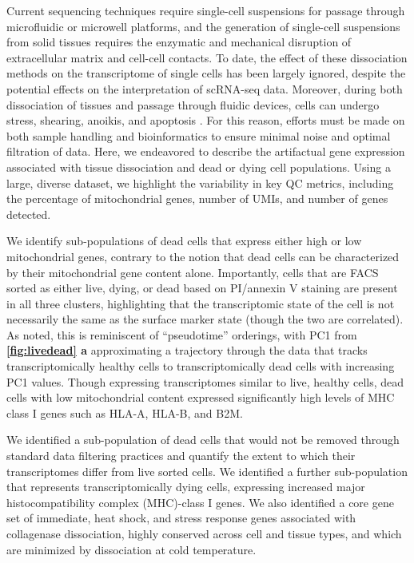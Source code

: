 Current sequencing techniques require single-cell suspensions for passage through microfluidic or microwell platforms, and the generation of single-cell suspensions from solid tissues requires the enzymatic and mechanical disruption of extracellular matrix and cell-cell contacts. To date, the effect of these dissociation methods on the transcriptome of single cells has been largely ignored, despite the potential effects on the interpretation of scRNA-seq data. Moreover, during both dissociation of tissues and passage through fluidic devices, cells can undergo stress, shearing, anoikis, and apoptosis \cite{aljanahi2018introduction}. For this reason, efforts must be made on both sample handling and bioinformatics to ensure minimal noise and optimal filtration of data. Here, we endeavored to describe the artifactual gene expression associated with tissue dissociation and dead or dying cell populations. Using a large, diverse dataset, we highlight the variability in key QC metrics, including the percentage of mitochondrial genes, number of UMIs, and number of genes detected. 

We identify sub-populations of dead cells that express either high or low mitochondrial genes, contrary to the notion that dead cells can be characterized by their mitochondrial gene content alone. Importantly, cells that are FACS sorted as either live, dying, or dead based on PI/annexin V staining are present in all three clusters, highlighting that the transcriptomic state of the cell is not necessarily the same as the surface marker state (though the two are correlated). As noted, this is reminiscent of “pseudotime” orderings, with PC1 from \textbf{\autoref{fig:livedead} a}  approximating a trajectory through the data that tracks transcriptomically healthy cells to transcriptomically dead cells with increasing PC1 values. Though expressing transcriptomes similar to live, healthy cells, dead cells with low mitochondrial content expressed significantly high levels of MHC class I genes such as HLA-A, HLA-B, and B2M.

 We identified a sub-population of dead cells that would not be removed through standard data filtering practices and quantify the extent to which their transcriptomes differ from live sorted cells. We identified a further sub-population that represents transcriptomically dying cells, expressing increased major histocompatibility complex (MHC)-class I genes. We also identified a core gene set of immediate, heat shock, and stress response genes associated with collagenase dissociation, highly conserved across cell and tissue types, and which are minimized by dissociation at cold temperature.






